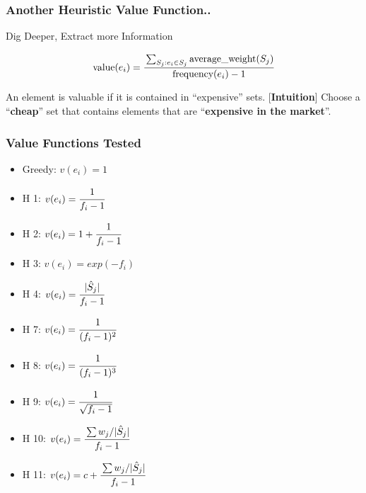 \documentclass{beamer}
\newlength\myheight
\newlength\mydepth
\newcommand*\inlinegraphics[1]{%
  \settototalheight\myheight{Xygp}%
  \settodepth\mydepth{Xygp}%
  \raisebox{-\mydepth}{\texttt{[image: \#1]}}%
}
\begin{document}
\begin{frame}
\frametitle{Another Heuristic Value Function..}
Dig Deeper, Extract more Information \inlinegraphics{excavators.eps}
\begin{minipage}{0.25\textwidth}
%
\end{minipage}%
\begin{minipage}{0.75\textwidth}
$$ \text{value}(e_i) = \cfrac{\sum_{S_j: e_i \in S_j} \text{average\_weight}(S_j)}{\text{frequency}(e_i)-1}$$
\end{minipage}
An element is valuable if it is contained in ``expensive'' sets.
[\textbf{Intuition}] Choose a ``\textbf{cheap}'' set that contains elements that are ``\textbf{expensive in the market}''.
\end{frame}

\begin{frame}
\frametitle{Value Functions Tested}
\begin{minipage}{0.50\textwidth}
\begin{itemize}
\item Greedy: $v(e_i) = 1$
\item H 1: $v(e_i) = \cfrac{1}{f_i -1}$
\item H 2: $v(e_i) = 1+\cfrac{1}{f_i -1}$
\item H 3: $v(e_i) = exp(-f_i)$
\item H 4: $v(e_i) = \cfrac{|\hat{S}_j|}{f_i -1}$
\item H 7: $v(e_i) = \cfrac{1}{(f_i -1)^2}$

\end{itemize}
\end{minipage}%
\begin{minipage}{0.50\textwidth}
\begin{itemize}
\item H 8: $v(e_i) = \cfrac{1}{(f_i -1)^3}$
\item H 9: $v(e_i) = \cfrac{1}{\sqrt{f_i -1}}$
\item H 10: $v(e_i) = \cfrac{\sum w_j/|\hat{S}_j|}{f_i -1}$
\item H 11: $v(e_i) = c + \cfrac{\sum w_j/|\hat{S}_j|}{f_i -1}$
\end{itemize}
\end{minipage}
\end{frame}
\end{document}

